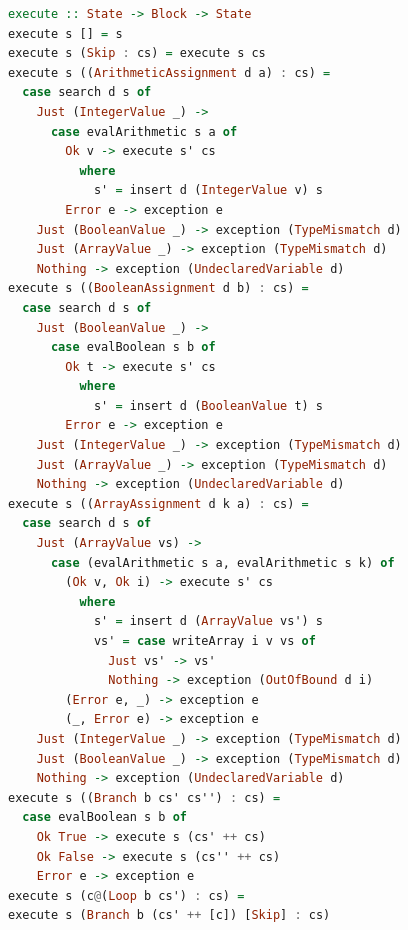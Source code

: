 \documentclass[12pt,a4paper]{article}
\begin{document}
\begin{lstlisting}[language=Haskell, style=custom-style]
execute :: State -> Block -> State
execute s [] = s
execute s (Skip : cs) = execute s cs
execute s ((ArithmeticAssignment d a) : cs) =
  case search d s of
    Just (IntegerValue _) ->
      case evalArithmetic s a of
        Ok v -> execute s' cs
          where
            s' = insert d (IntegerValue v) s
        Error e -> exception e
    Just (BooleanValue _) -> exception (TypeMismatch d)
    Just (ArrayValue _) -> exception (TypeMismatch d)
    Nothing -> exception (UndeclaredVariable d)
execute s ((BooleanAssignment d b) : cs) =
  case search d s of
    Just (BooleanValue _) ->
      case evalBoolean s b of
        Ok t -> execute s' cs
          where
            s' = insert d (BooleanValue t) s
        Error e -> exception e
    Just (IntegerValue _) -> exception (TypeMismatch d)
    Just (ArrayValue _) -> exception (TypeMismatch d)
    Nothing -> exception (UndeclaredVariable d)
execute s ((ArrayAssignment d k a) : cs) =
  case search d s of
    Just (ArrayValue vs) ->
      case (evalArithmetic s a, evalArithmetic s k) of
        (Ok v, Ok i) -> execute s' cs
          where
            s' = insert d (ArrayValue vs') s
            vs' = case writeArray i v vs of
              Just vs' -> vs'
              Nothing -> exception (OutOfBound d i)
        (Error e, _) -> exception e
        (_, Error e) -> exception e
    Just (IntegerValue _) -> exception (TypeMismatch d)
    Just (BooleanValue _) -> exception (TypeMismatch d)
    Nothing -> exception (UndeclaredVariable d)
execute s ((Branch b cs' cs'') : cs) =
  case evalBoolean s b of
    Ok True -> execute s (cs' ++ cs)
    Ok False -> execute s (cs'' ++ cs)
    Error e -> exception e
execute s (c@(Loop b cs') : cs) =
execute s (Branch b (cs' ++ [c]) [Skip] : cs)
\end{lstlisting}
\end{document}
